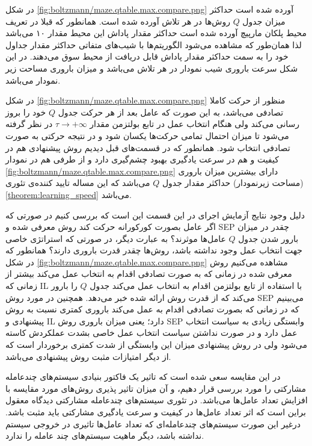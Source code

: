 در شکل
\ref{fig:boltzmann/maze.qtable.max.compare.png}
آورده شده است حداکثر میزان جدول $Q$ روش‌ها در هر تلاش آورده شده است. همانطور که قبلا در تعریف محیط پلکان مارپیچ آورده شده است حداکثر مقدار پاداش این محیط مقدار ۱۰ می‌باشد لذا همان‌طور که مشاهده می‌شود الگوریتم‌ها با شیب‌های متفاتی حداکثر مقدار جداول خود را به سمت حداکثر مقدار پاداش قابل دریافت از محیط سوق می‌دهند. در این شکل سرعت باروری شیب نمودار در هر تلاش می‌باشد و میزان باروری مساحت زیر نمودار می‌باشد.


در شکل
\ref{fig:boltzmann/maze.qtable.max.compare.png}
منظور از  حرکت کاملا تصادفی می‌باشد، به این صورت که عامل بعد از هر حرکت جدول $Q$ خود را بروز رسانی می‌کند ولی هنگام انتخاب عمل در تابع بولتزمن مقدار $\tau \rightarrow +\infty$ در نظر گرفته می‌شود تا میزان احتمال تمامی حرکت‌ها یکسان شود و در نتیجه حرکتی به صورت تصادفی انتخاب شود. همانطور که در قسمت‌های قبل دیدیم روش پیشنهادی هم در کیفیت و هم در سرعت یادگیری بهبود چشم‌گیری دارد و از طرفی هم در نمودار
\ref{fig:boltzmann/maze.qtable.max.compare.png}
دارای بیشترین میزان باروری (مساحت زیرنمودار) حداکثر مقدار جدول $Q$ می‌باشد که این مساله تایید کننده‌ی تئوری
\ref{theorem:learning_speed}
می‌باشد.

دلیل وجود نتایج آزمایش‌ اجرای  در این قسمت این است که بررسی کنیم در صورتی که اگر عامل بصورت کورکورانه حرکت کند روش‌ معرفی شده و SEP چقدر در میزان بارور شدن جدول $Q$ عامل‌ها موثرند؟ به عبارت دیگر، در صورتی که استراتژی خاصی جهت انتخاب عمل وجود نداشته باشد، روش‌ها چقدر قدرت باروری دارند؟ همانطور که در شکل
\ref{fig:boltzmann/maze.qtable.max.compare.png}
مشاهده می‌کنیم روش معرفی شده در زمانی که به صورت تصادفی اقدام به انتخاب عمل می‌کند بیشتر از زمانی که IL با استفاده از تابع بولتزمن اقدام به انتخاب عمل می‌کند جدول $Q$ را بارور می‌کند که از قدرت روش ارائه شده خبر می‌دهد. همچنین در مورد روش SEP می‌بینیم که در زمانی که بصورت تصادفی اقدام به عمل می‌کند باروری کمتری نسبت به روش پیشنهادی و IL دارد؛ یعنی میزان باروری روش SEP وابستگی زیادی به سیاست انتخاب عمل دارد و در صورت نداشتن سیاست انتخاب عمل خاصی بشدت عملکردش کاسته می‌شود ولی در روش پیشنهادی میزان این وابستگی از شدت کمتری برخوردار است که از دیگر امتیازات مثبت روش پیشنهادی می‌باشد.

 در این مقایسه سعی شده است که تاثیر یک فاکتور بنیادی سیستم‌های چندعامله مشارکتی را مورد بررسی قرار دهیم، و آن میزان تاثیر پذیری روش‌های مورد مقایسه با افزایش تعداد عامل‌ها می‌باشد. در تئوری سیستم‌های چندعامله مشارکتی دیدگاه معقول براین است که اثر تعداد عامل‌ها در کیفیت و سرعت یادگیری مشارکتی باید مثبت باشد. درغیر این صورت سیستم‌های چندعامله‌ای که تعداد عامل‌ها تاثیری در خروجی سیستم نداشته باشد، دیگر ماهیت سیستم‌های چند عامله را ندارد.

